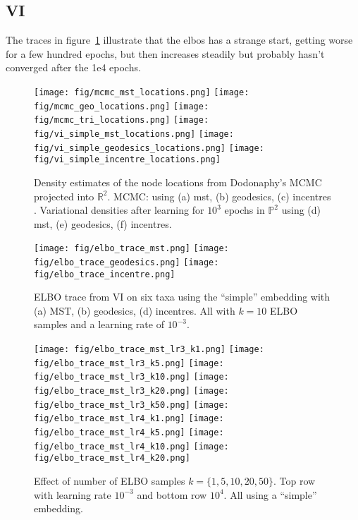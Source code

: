 \documentclass[11pt]{article}
\begin{document}
\subsection{VI}
The traces in figure~\ref{fig:elbos} illustrate that the elbos has a strange start, getting worse for a few hundred epochs, but then increases steadily but probably hasn’t converged after the 1e4 epochs.
\begin{figure}[htbp]
\begin{center}
\texttt{[image: fig/mcmc\_mst\_locations.png]}%
\texttt{[image: fig/mcmc\_geo\_locations.png]}%
\texttt{[image: fig/mcmc\_tri\_locations.png]}
\texttt{[image: fig/vi\_simple\_mst\_locations.png]}%
\texttt{[image: fig/vi\_simple\_geodesics\_locations.png]}%
\texttt{[image: fig/vi\_simple\_incentre\_locations.png]}
\caption{Density estimates of the node locations from Dodonaphy's MCMC projected into $\mathbb{R}^{2}$. MCMC: using (a) mst, (b) geodesics, (c) incentres . 
Variational densities after learning for $10^{3}$ epochs in $\mathbb{P}^{2}$ using (d) mst, (e) geodesics, (f) incentres.
}
\label{fig:elbos}
\end{center}
\end{figure}

\begin{figure}[htbp]
\begin{center}
\texttt{[image: fig/elbo\_trace\_mst.png]}%
\texttt{[image: fig/elbo\_trace\_geodesics.png]}%
\texttt{[image: fig/elbo\_trace\_incentre.png]}
\caption{ELBO trace from VI on six taxa using the ``simple'' embedding with (a) MST, (b) geodesics, (d) incentres. All with $k=10$ ELBO samples and a learning rate of $10^{-3}$.}
\label{fig:elbo_method}
\end{center}
\end{figure}

\begin{figure}[htbp]
\texttt{[image: fig/elbo\_trace\_mst\_lr3\_k1.png]}%
\texttt{[image: fig/elbo\_trace\_mst\_lr3\_k5.png]}%
\texttt{[image: fig/elbo\_trace\_mst\_lr3\_k10.png]}%
\texttt{[image: fig/elbo\_trace\_mst\_lr3\_k20.png]}%
\texttt{[image: fig/elbo\_trace\_mst\_lr3\_k50.png]}
\texttt{[image: fig/elbo\_trace\_mst\_lr4\_k1.png]}%
\texttt{[image: fig/elbo\_trace\_mst\_lr4\_k5.png]}%
\texttt{[image: fig/elbo\_trace\_mst\_lr4\_k10.png]}%
\texttt{[image: fig/elbo\_trace\_mst\_lr4\_k20.png]}
\caption{Effect of number of ELBO samples $k=\{1, 5, 10, 20, 50\}$.
Top row with learning rate $10^{-3}$ and bottom row $10^{4}$.
All using a ``simple'' embedding.}
\label{fig:k_samples}
\end{figure}
\end{document}
